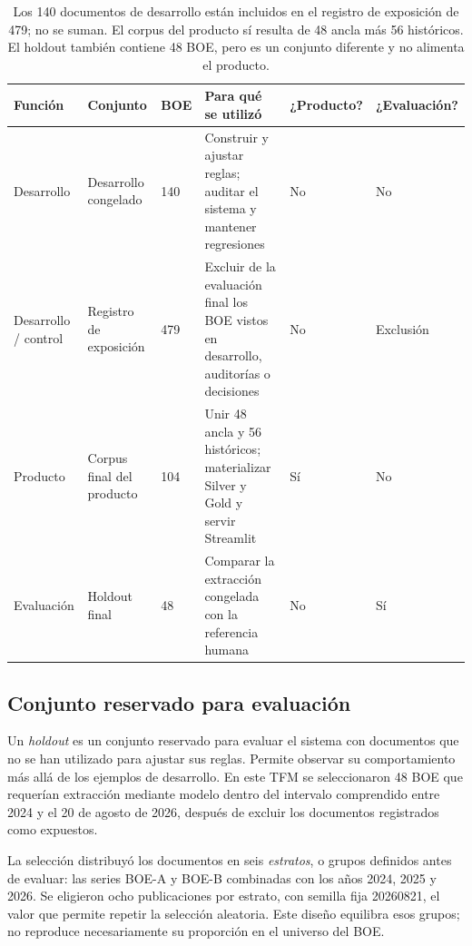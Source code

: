 \begin{table}[htbp]
\centering
\footnotesize
\setlength{\tabcolsep}{4pt}
\renewcommand{\arraystretch}{1.2}
\begin{tabular}{L{1.8cm} L{2.35cm} C{0.75cm} L{4.0cm} C{1.25cm} C{1.25cm}}
\hline
Función & Conjunto & BOE & Para qué se utilizó & ¿Producto? & ¿Evaluación? \\
\hline
Desarrollo & Desarrollo congelado & 140 & Construir y ajustar reglas; auditar el sistema y mantener regresiones & No & No \\
Desarrollo / control & Registro de exposición & 479 & Excluir de la evaluación final los BOE vistos en desarrollo, auditorías o decisiones & No & Exclusión \\
Producto & Corpus final del producto & 104 & Unir 48 ancla y 56 históricos; materializar Silver y Gold y servir Streamlit & Sí & No \\
Evaluación & Holdout final & 48 & Comparar la extracción congelada con la referencia humana & No & Sí \\
\hline
\end{tabular}
\caption[Conjuntos documentales y funciones]{Los 140 documentos de desarrollo
están incluidos en el registro de exposición de 479; no se suman. El corpus
del producto sí resulta de 48 ancla más 56 históricos. El holdout también
contiene 48 BOE, pero es un conjunto diferente y no alimenta el producto.}
\label{tab:corpus}
\end{table}

\subsection{Conjunto reservado para evaluación}
Un \emph{holdout} es un conjunto reservado para evaluar el sistema con
documentos que no se han utilizado para ajustar sus reglas. Permite observar
su comportamiento más allá de los ejemplos de desarrollo. En este TFM se
seleccionaron 48 BOE que requerían extracción mediante modelo dentro del
intervalo comprendido entre 2024 y el 20 de agosto de 2026, después de excluir
los documentos registrados como expuestos.

La selección distribuyó los documentos en seis \emph{estratos}, o grupos
definidos antes de evaluar: las series BOE-A y BOE-B combinadas con los años
2024, 2025 y 2026. Se eligieron ocho publicaciones por estrato, con semilla
fija 20260821, el valor que permite repetir la selección aleatoria. Este
diseño equilibra esos grupos; no reproduce necesariamente su proporción en
el universo del BOE.

